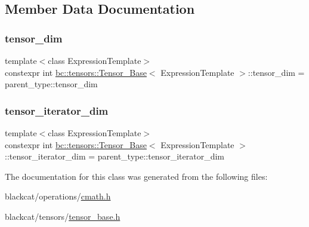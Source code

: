 \subsection{Member Data Documentation}
\mbox{\label{classbc_1_1tensors_1_1Tensor__Base_a0061d78358d7085b63ee03309b4ac84f}} 
\subsubsection{\texorpdfstring{tensor\+\_\+dim}{tensor\_dim}}
{\footnotesize\ttfamily template$<$class Expression\+Template$>$ \\
constexpr int \hyperlink{classbc_1_1tensors_1_1Tensor__Base}{bc\+::tensors\+::\+Tensor\+\_\+\+Base}$<$ Expression\+Template $>$\+::tensor\+\_\+dim = parent\+\_\+type\+::tensor\+\_\+dim\hspace{0.3cm}{\ttfamily [static]}}

\mbox{\label{classbc_1_1tensors_1_1Tensor__Base_af0e5a8a4150e1345013cc05a6087d00b}} 
\subsubsection{\texorpdfstring{tensor\+\_\+iterator\+\_\+dim}{tensor\_iterator\_dim}}
{\footnotesize\ttfamily template$<$class Expression\+Template$>$ \\
constexpr int \hyperlink{classbc_1_1tensors_1_1Tensor__Base}{bc\+::tensors\+::\+Tensor\+\_\+\+Base}$<$ Expression\+Template $>$\+::tensor\+\_\+iterator\+\_\+dim = parent\+\_\+type\+::tensor\+\_\+iterator\+\_\+dim\hspace{0.3cm}{\ttfamily [static]}}



The documentation for this class was generated from the following files\+:\begin{DoxyCompactItemize}
\item 
blackcat/operations/\hyperlink{cmath_8h}{cmath.\+h}\item 
blackcat/tensors/\hyperlink{tensor__base_8h}{tensor\+\_\+base.\+h}\end{DoxyCompactItemize}
